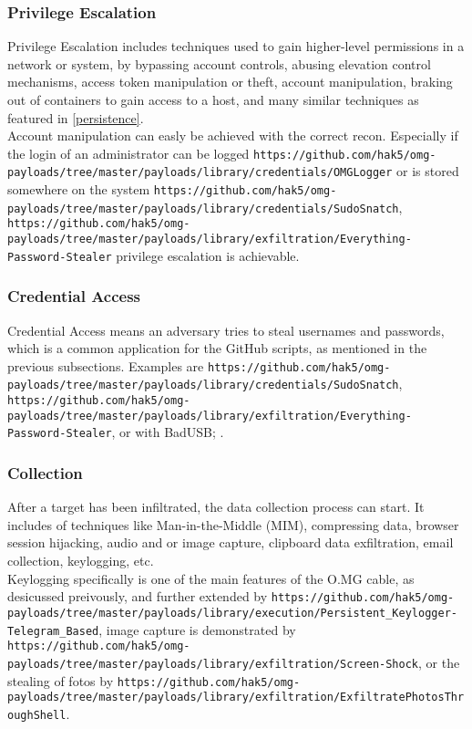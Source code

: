 \subsubsection{Privilege Escalation}

Privilege Escalation includes techniques used to gain higher-level permissions in a network or system, by bypassing account controls, abusing elevation control mechanisms, access token manipulation or theft, account manipulation, braking out of containers to gain access to a host, and many similar techniques as featured in \ref{persistence}. \\
Account manipulation can easly be achieved with the correct recon. Especially if the login of an administrator can be logged \verb|https://github.com/hak5/omg-payloads/tree/master/payloads/library/credentials/OMGLogger| or is stored somewhere on the system \verb|https://github.com/hak5/omg-payloads/tree/master/payloads/library/credentials/SudoSnatch|, \verb|https://github.com/hak5/omg-payloads/tree/master/payloads/library/exfiltration/Everything-Password-Stealer| privilege escalation is achievable.

\subsubsection{Credential Access}

Credential Access means an adversary tries to steal usernames and passwords, which is a common application for the GitHub scripts, as mentioned in the previous subsections. Examples are \verb|https://github.com/hak5/omg-payloads/tree/master/payloads/library/credentials/SudoSnatch|, \verb|https://github.com/hak5/omg-payloads/tree/master/payloads/library/exfiltration/Everything-Password-Stealer|, or with BadUSB;  \cite{muslimImplementationAnalysisUSB2020}. 


\subsubsection{Collection}
After a target has been infiltrated, the data collection process can start. It includes of techniques like Man-in-the-Middle (MIM), compressing data, browser session hijacking, audio and or image capture, clipboard data exfiltration, email collection, keylogging, etc. \\
Keylogging specifically is one of the main features of the O.MG cable, as desicussed preivously, and further extended by \verb|https://github.com/hak5/omg-payloads/tree/master/payloads/library/execution/Persistent_Keylogger-Telegram_Based|, image capture is demonstrated by \verb|https://github.com/hak5/omg-payloads/tree/master/payloads/library/exfiltration/Screen-Shock|, or the stealing of fotos by \verb|https://github.com/hak5/omg-payloads/tree/master/payloads/library/exfiltration/ExfiltratePhotosThroughShell|. 


